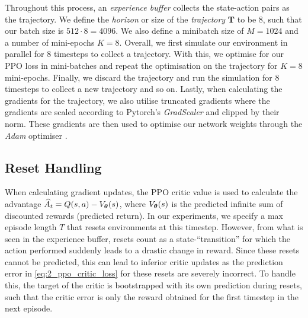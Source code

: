 Throughout this process, an \textit{experience buffer} collects the state-action pairs as the trajectory. We define the \textit{horizon} or size of the \textit{trajectory} $\boldsymbol{T}$ to be $8$, such that our batch size is $512\cdot8 = 4096$. We also define a minibatch size of $M=1024$ and a number of mini-epochs $K=8$. Overall, we first simulate our environment in parallel for 8 timesteps to collect a trajectory. With this, we optimise for our PPO loss in mini-batches and repeat the optimisation on the trajectory for $K=8$ mini-epochs. Finally, we discard the trajectory and run the simulation for 8 timesteps to collect a new trajectory and so on. Lastly, when calculating the gradients for the trajectory, we also utilise truncated gradients where the gradients are scaled according to Pytorch's \textit{GradScaler} and clipped by their norm. These gradients are then used to optimise our network weights through the \textit{Adam} optimiser \cite{adam}.

\subsection{Reset Handling}
\label{subsec:6_reset_handling}
When calculating gradient updates, the PPO critic value is used to calculate the advantage $\widehat{A}_t = Q(s,a) - V_{\boldsymbol{\theta}}(s)$, where $V_{\boldsymbol{\theta}}(s)$ is the predicted infinite sum of discounted rewards (predicted return). In our experiments, we specify a max episode length $T$ that resets environments at this timestep. However, from what is seen in the experience buffer, resets count as a state-``transition'' for which the action performed suddenly leads to a drastic change in reward.
Since these resets cannot be predicted, this can lead to inferior critic updates as the prediction error in \eqref{eq:2_ppo_critic_loss} for these resets are severely incorrect. To handle this, the target of the critic is bootstrapped with its own prediction during resets, such that the critic error is only the reward obtained for the first timestep in the next episode.